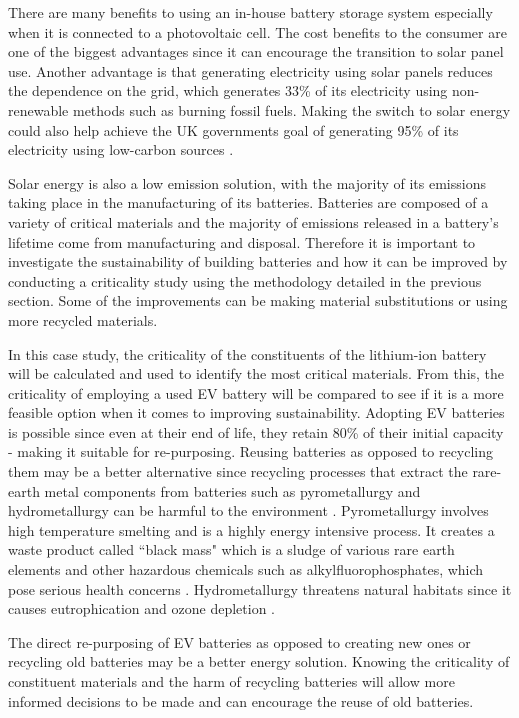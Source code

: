 \documentclass{article}
\begin{document}
There are many benefits to using an in-house battery storage system especially when it is connected to a photovoltaic cell. The cost benefits to the consumer are one of the biggest advantages since it can encourage the transition to solar panel use. Another advantage is that generating electricity using solar panels reduces the dependence on the grid, which generates 33\% of its electricity using non-renewable methods \cite{renewableshare} such as burning fossil fuels. Making the switch to solar energy could also help achieve the UK governments goal of generating 95\% of its electricity using low-carbon sources \cite{renewableshare}. 

Solar energy is also a low emission solution, with the majority of its emissions taking place in the manufacturing of its batteries. Batteries are composed of a variety of critical materials and the majority of emissions released in a battery's lifetime come from manufacturing and disposal. Therefore it is important to investigate the sustainability of building batteries and how it can be improved by conducting a criticality study using the methodology detailed in the previous section. Some of the improvements can be making material substitutions or using more recycled materials. 

In this case study, the criticality of the constituents of the lithium-ion battery will be calculated and used to identify the most critical materials. From this, the criticality of employing a used EV battery will be compared to see if it is a more feasible option when it comes to improving sustainability. Adopting EV batteries is possible since even at their end of life, they retain 80\% of their initial capacity \cite{BAI2020304}- making it suitable for re-purposing. Reusing batteries as opposed to recycling them may be a better alternative since recycling processes that extract the rare-earth metal components from batteries such as pyrometallurgy and hydrometallurgy can be harmful to the environment \cite{sludge}. Pyrometallurgy involves high temperature smelting and is a highly energy intensive process. It creates a waste product called ``black mass" which is a sludge of various rare earth elements and other hazardous chemicals such as alkylfluorophosphates, which pose serious health concerns \cite{grutzke2015investigation}. Hydrometallurgy threatens natural habitats since it causes eutrophication and ozone depletion \cite{christensen2021risk}. 

The direct re-purposing of EV batteries as opposed to creating new ones or recycling old batteries may be a better energy solution. Knowing the criticality of constituent materials and the harm of recycling batteries will allow more informed decisions to be made and can encourage the reuse of old batteries.
\end{document}
